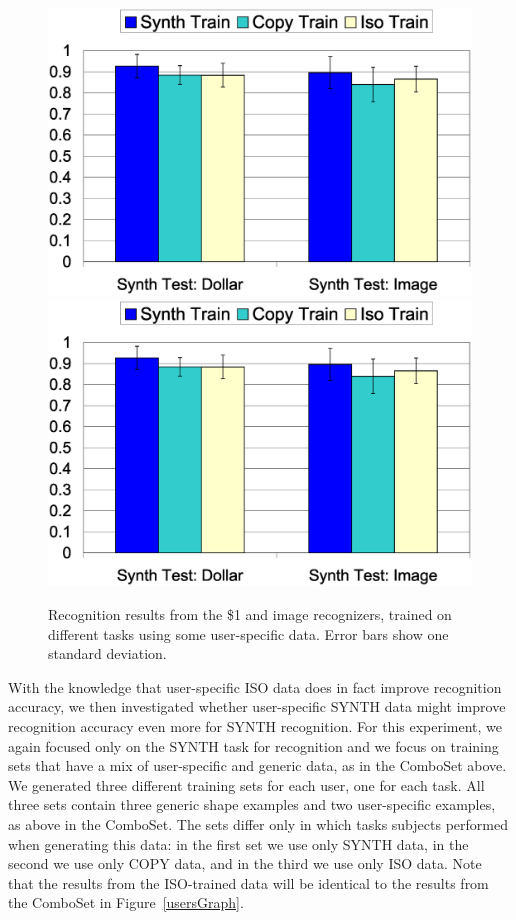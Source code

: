 \documentclass{egpubl}
\begin{document}
\begin{figure}
\ifpdf \includegraphics[width=1.0\hsize]{dollar_image_combo}
\else \includegraphics[width=1.0\hsize]{dollar_image_combo.eps} \fi
\caption{Recognition results from the \$1 and image recognizers, trained on different tasks using some user-specific data.  Error bars show one standard deviation.}
\label{comboGraph}
\end{figure}

With the knowledge that user-specific ISO data does in fact improve recognition accuracy, we then investigated 
whether user-specific SYNTH data might improve recognition accuracy even more for SYNTH recognition.  For this experiment, we again focused only on the SYNTH task for recognition and we focus on training sets that have a mix of user-specific and generic data, as in the ComboSet above.  We generated three different training sets for each user, one for each task.  All three sets contain three generic shape examples and two user-specific examples, as above in the ComboSet.  The sets differ only in which tasks subjects performed when generating this data: in the first set we use only SYNTH data, in the second we use only COPY data, and in the third we use only ISO data.  Note that the results from the ISO-trained data will be identical to the results from the ComboSet in Figure~\ref{usersGraph}.
\end{document}
